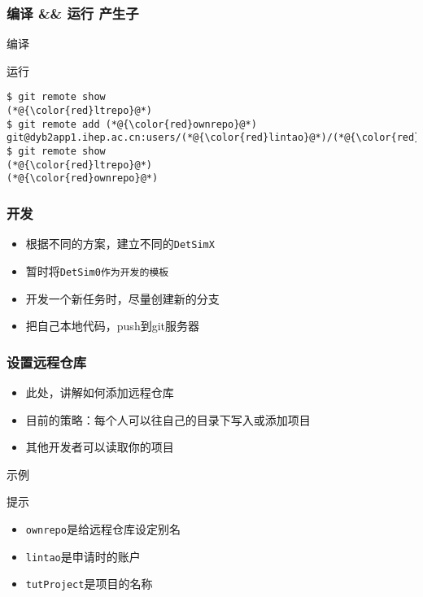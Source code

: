 \begin{frame}
    \frametitle{编译 \&\& 运行 产生子}
    \begin{block}{编译}
        \par\usebox{\QuickStartDybGeneratorCompile}
    \end{block}
    \begin{block}{运行}
        \par\usebox{\QuickStartDybGeneratorRun}
    \end{block}
\end{frame}

\newsavebox{\QuickStartDybDevRemote}
\begin{lrbox}{\QuickStartDybDevRemote}
\begin{lstlisting}
$ git remote show 
(*@{\color{red}ltrepo}@*)
$ git remote add (*@{\color{red}ownrepo}@*) git@dyb2app1.ihep.ac.cn:users/(*@{\color{red}lintao}@*)/(*@{\color{red}tutProject}@*)
$ git remote show 
(*@{\color{red}ltrepo}@*)
(*@{\color{red}ownrepo}@*)
\end{lstlisting}
\end{lrbox}

\begin{frame}
    \frametitle{开发}
    \begin{itemize}    
        \item 根据不同的方案，建立不同的\tt{DetSim{\color{red}X}}
        \item 暂时将\tt{DetSim0}作为开发的模板
        \item 开发一个新任务时，尽量创建新的分支
        \item 把自己本地代码，push到git服务器
    \end{itemize}
\end{frame}

\begin{frame}
    \frametitle{设置远程仓库}
    \begin{itemize}    
        \item 此处，讲解如何添加远程仓库
        \item 目前的策略：每个人可以往自己的目录下{\Large 写入}或{\Large 添加}项目
        \item 其他开发者可以{\Large 读取}你的项目
    \end{itemize}
    \begin{block}{示例}
        \par\usebox{\QuickStartDybDevRemote}
    \end{block}
    \begin{alertblock}{提示}
        \begin{itemize}    
            \item {\tt ownrepo}是给远程仓库设定别名
            \item {\tt lintao}是申请时的账户
            \item {\tt tutProject}是项目的名称
        \end{itemize}
    \end{alertblock}
\end{frame}


